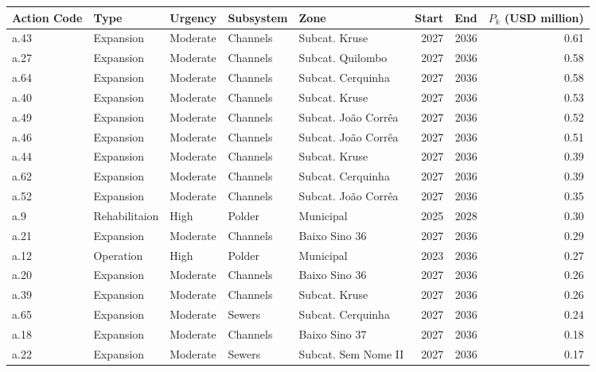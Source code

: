 \documentclass[11pt]{article}
\begin{document}
\begin{table}[h]
    \centering
    \tiny
\begin{tabular}{lllllrrr}
\toprule
\textbf{Action Code} &          \textbf{Type}&   \textbf{Urgency} &   \textbf{Subsystem} &                \textbf{Zone} &  \textbf{Start} &  \textbf{End} &    \textbf{$P_k$ (USD million)} \\
\midrule
a.43 &     Expansion &  Moderate & Channels &       Subcat. Kruse &   2027 & 2036 &  0.61 \\
a.27 &     Expansion &  Moderate & Channels &    Subcat. Quilombo &   2027 & 2036 &  0.58 \\
a.64 &     Expansion &  Moderate & Channels &   Subcat. Cerquinha &   2027 & 2036 &  0.58 \\
a.40 &     Expansion &  Moderate & Channels &       Subcat. Kruse &   2027 & 2036 &  0.53 \\
a.49 &     Expansion &  Moderate & Channels & Subcat. João Corrêa &   2027 & 2036 &  0.52 \\
a.46 &     Expansion &  Moderate & Channels & Subcat. João Corrêa &   2027 & 2036 &  0.51 \\
a.44 &     Expansion &  Moderate & Channels &       Subcat. Kruse &   2027 & 2036 &  0.39 \\
a.62 &     Expansion &  Moderate & Channels &   Subcat. Cerquinha &   2027 & 2036 &  0.39 \\
a.52 &     Expansion &  Moderate & Channels & Subcat. João Corrêa &   2027 & 2036 &  0.35 \\
 a.9 & Rehabilitaion &      High &   Polder &           Municipal &   2025 & 2028 &  0.30 \\
a.21 &     Expansion &  Moderate & Channels &       Baixo Sino 36 &   2027 & 2036 &  0.29 \\
a.12 &     Operation &      High &   Polder &           Municipal &   2023 & 2036 &  0.27 \\
a.20 &     Expansion &  Moderate & Channels &       Baixo Sino 36 &   2027 & 2036 &  0.26 \\
a.39 &     Expansion &  Moderate & Channels &       Subcat. Kruse &   2027 & 2036 &  0.26 \\
a.65 &     Expansion &  Moderate &   Sewers &   Subcat. Cerquinha &   2027 & 2036 &  0.24 \\
a.18 &     Expansion &  Moderate & Channels &       Baixo Sino 37 &   2027 & 2036 &  0.18 \\
a.22 &     Expansion &  Moderate &   Sewers & Subcat. Sem Nome II &   2027 & 2036 &  0.17 \\

\end{tabular}
\end{table}
\end{document}
